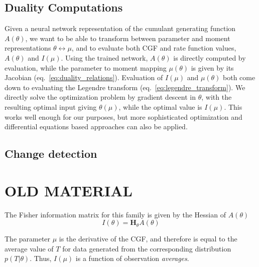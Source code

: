 \documentclass[10pt]{article}      %
\begin{document}
\subsection{Duality Computations}
Given a neural network representation of the cumulant generating function $A(\theta)$, we want to be able to transform between parameter and moment representations $\theta \leftrightarrow \mu$, and to evaluate both CGF and rate function values, $A(\theta)$ and $I(\mu)$.
Using the trained network, $A(\theta)$ is directly computed by evaluation, while the parameter to moment mapping $\mu(\theta)$ is given by its Jacobian (eq.~\ref{eq:duality_relations}).
Evaluation of $I(\mu)$ and $\mu(\theta)$ both come down to evaluating the Legendre transform (eq.~\ref{eq:legendre_transform}). 
We directly solve the optimization problem by gradient descent in $\theta$, with the resulting optimal input giving $\theta(\mu)$, while the optimal value is $I(\mu)$.
This works well enough for our purposes, but more sophisticated optimization and differential equations based approaches can also be applied.


\subsection{Change detection}



\section{OLD MATERIAL}

The Fisher information matrix for this family is given by the Hessian of $A(\theta)$ 
\begin{equation}
  I(\theta) = \bm{H}_\theta A(\theta) 
\end{equation}

The parameter $\mu$ is the derivative of the CGF, and therefore is equal to the average value of $T$ for data generated from the corresponding distribution $p(T|\theta)$.
Thus, $I(\mu)$ is a function of observation \textit{averages}.




\end{document}
